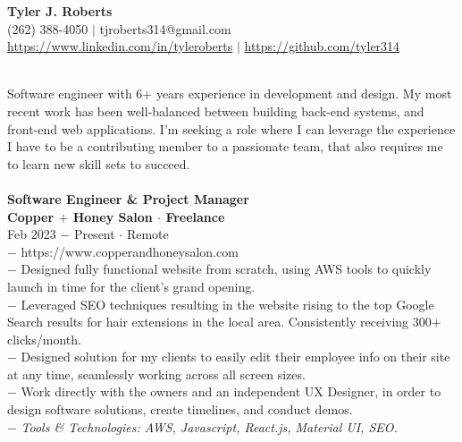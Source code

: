 \documentclass{resume}
\begin{document}
\begin{center}
{\LARGE \bf Tyler J. Roberts} \\[1mm]
\footnotesize
(262) 388-4050 $|$
tjroberts314@gmail.com \\[1mm]
\href{https://www.linkedin.com/in/tyleroberts}{https://www.linkedin.com/in/tyleroberts} $|$
\href{https://github.com/tyler314}{https://github.com/tyler314}
\end{center}
\begin{flushleft}

 \\
{
\scriptsize
\tab Software engineer with 6+ years experience in  development and design. My most recent work has been well-balanced between building back-end systems, and front-end  web applications. I'm seeking a role where I can leverage the experience I have to be a contributing member to a passionate team, that also requires me to learn new skill sets to succeed.
\\[4mm]
}
\\[2mm]

\normalsize{\bf Software Engineer \& Project Manager}\\
\footnotesize{\bf Copper $+$ Honey Salon $\cdot$ Freelance}\\
\footnotesize{Feb 2023 $-$ Present $\cdot$ Remote}\\[1mm]
{\scriptsize
	$-$ https://www.copperandhoneysalon.com\\
	$-$ Designed fully functional website from scratch, using AWS tools to quickly launch in time for the client's grand opening.\\
	$-$ Leveraged SEO techniques resulting in the website rising to the top Google Search results for hair extensions in the local area. Consistently receiving 300$+$ clicks/month.\\
	$-$ Designed solution for my clients to easily edit their employee info on their site at any time, seamlessly working across all screen sizes.\\
	$-$ Work directly with the owners and an independent UX Designer, in order to design software solutions, create timelines, and conduct demos.\\
	$-$ \textit{Tools \& Technologies: AWS, Javascript, React.js, Material UI, SEO.}
}\\[3mm]


\end{flushleft}
\end{document}

